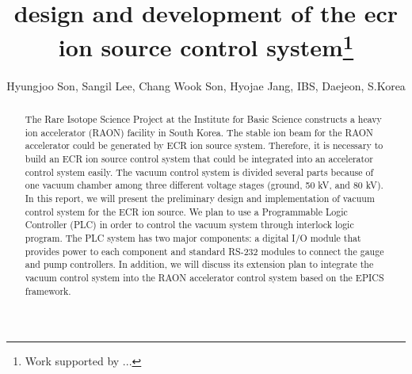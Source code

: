 \documentclass[a4paper,
              ]{jacow}
\begin{document}
\title{design and development of the ecr ion source control system\thanks{Work supported by ...}}

\author{ Hyungjoo Son, Sangil Lee, Chang Wook Son, Hyojae Jang, IBS, Daejeon, S.Korea\\}

\maketitle

%
\begin{abstract}
The Rare Isotope Science Project at the Institute for Basic Science constructs a heavy ion accelerator (RAON) facility in South Korea. The stable ion beam for the RAON accelerator could be generated by ECR ion source system. Therefore, it is necessary to build an ECR ion source control system that could be integrated into an accelerator control system easily. The vacuum control system is divided several parts because of one vacuum chamber among three different voltage stages (ground, 50 kV, and 80 kV).
In this report, we will present the preliminary design and implementation of vacuum control system for the ECR ion source. We plan to use a Programmable Logic Controller (PLC) in order to control the vacuum system through interlock logic program. The PLC system has two major components: a digital I/O module that provides power to each component and standard RS-232 modules to connect the gauge and pump controllers. In addition, we will discuss its extension plan to integrate the vacuum control system into the RAON accelerator control system based on the EPICS framework.
  
\end{abstract}
\end{document}
